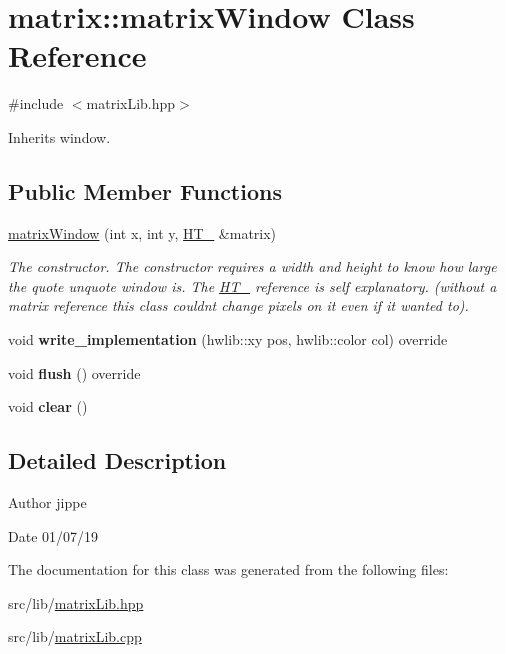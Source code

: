 \hypertarget{classmatrix_1_1matrix_window}{}\section{matrix\+:\+:matrix\+Window Class Reference}
\label{classmatrix_1_1matrix_window}


{\ttfamily \#include $<$matrix\+Lib.\+hpp$>$}



Inherits window.

\subsection*{Public Member Functions}
\begin{DoxyCompactItemize}
\item 
\hyperlink{group__matrix_window_gaa2b62af82dce82f367c3dd463f9bdcd5}{matrix\+Window} (int x, int y, \hyperlink{classmatrix_1_1_h_t__1632}{H\+T\+\_} \&matrix)
\begin{DoxyCompactList}\small\item\em The constructor. The constructor requires a width and height to know how large the quote unquote window is. The \hyperlink{classmatrix_1_1_h_t__1632}{H\+T\+\_} reference is self explanatory. (without a matrix reference this class couldn\textquotesingle{}t change pixels on it even if it wanted to). \end{DoxyCompactList}\item 
void {\bfseries write\+\_\+implementation} (hwlib\+::xy pos, hwlib\+::color col) override
\item 
void {\bfseries flush} () override
\item 
void {\bfseries clear} ()
\end{DoxyCompactItemize}


\subsection{Detailed Description}
\begin{DoxyAuthor}{Author}
jippe 
\end{DoxyAuthor}
\begin{DoxyDate}{Date}
01/07/19 
\end{DoxyDate}


The documentation for this class was generated from the following files\+:\begin{DoxyCompactItemize}
\item 
src/lib/\hyperlink{matrix_lib_8hpp}{matrix\+Lib.\+hpp}\item 
src/lib/\hyperlink{matrix_lib_8cpp}{matrix\+Lib.\+cpp}\end{DoxyCompactItemize}
